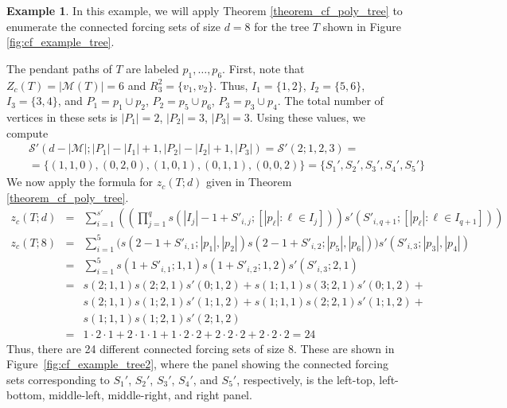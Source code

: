 \documentclass[11pt]{article}
\theoremstyle{definition}
\newtheorem{example}{Example}
\newcommand{\1}{\vspace{0.1cm}}
\newcommand{\2}{\vspace{0.2cm}}
\newcommand{\3}{\vspace{0.3cm}}
\begin{document}
\begin{example}
\label{example_tree_cf_poly}
In this example, we will apply Theorem \ref{theorem_cf_poly_tree} to enumerate the connected forcing sets of size $d=8$ for the tree $T$ shown in Figure \ref{fig:cf_example_tree}. 

The pendant paths of $T$ are labeled $p_1,\ldots,p_6$. First, note that $Z_c(T)=|\mathcal{M}(T)|=6$ and $R_3^2=\{v_1,v_2\}$. Thus, $I_1=\{1,2\}$, $I_2=\{5,6\}$, $I_3=\{3,4\}$, and $P_1=p_1\cup p_2$, $P_2=p_5\cup p_6$, $P_3=p_3\cup p_4$. The total number of vertices in these sets is $|P_1|=2$, $|P_2|=3$, $|P_3|=3$. Using these values, we compute
\begin{eqnarray*}
&&\mathcal{S}'(d-|\mathcal{M}|;|P_1|-|I_1|+1,|P_2|-|I_2|+1,|P_3|)=\mathcal{S}'(2;1,2,3)=\\
&&=\{(1,1,0),(0,2,0),(1,0,1),(0,1,1),(0,0,2)\}=\{S_1',S_2',S_3',S_4',S_5'\}
\end{eqnarray*}
We now apply the formula for $z_c(T;d)$ given in Theorem \ref{theorem_cf_poly_tree}.
\begin{eqnarray*}
z_c(T;d)&=&\sum_{i=1}^{s'}\left(\left(\prod_{j=1}^q s(|I_j|-1+S'_{i,j};[|p_\ell|:\ell\in I_j])\right)s'(S'_{i,q+1};[|p_\ell|:\ell\in I_{q+1}])\right)\\
z_c(T;8)&=&\sum_{i=1}^{5}\Big(s(2-1+S'_{i,1};|p_1|,|p_2|)s(2-1+S'_{i,2};|p_5|,|p_6|)\Big)s'(S'_{i,3};|p_3|,|p_4|)\\
&=&\sum_{i=1}^{5}s(1+S'_{i,1};1,1)s(1+S'_{i,2};1,2)s'(S'_{i,3};2,1)\\
&=&s(2;1,1)s(2;2,1)s'(0;1,2)+s(1;1,1)s(3;2,1)s'(0;1,2)+\\
&&s(2;1,1)s(1;2,1)s'(1;1,2)+s(1;1,1)s(2;2,1)s'(1;1,2)+\\
&&s(1;1,1)s(1;2,1)s'(2;1,2)\\
&=&1\cdot 2\cdot 1+2\cdot 1\cdot 1+1\cdot 2\cdot 2+2\cdot 2\cdot 2+2\cdot 2\cdot 2=24
\end{eqnarray*}
Thus, there are 24 different connected forcing sets of size 8. These are shown in Figure~\ref{fig:cf_example_tree2}, where the panel showing the connected forcing sets corresponding to $S_1'$, $S_2'$, $S_3'$, $S_4'$, and $S_5'$, respectively, is the left-top, left-bottom, middle-left, middle-right, and right panel. 




\newcommand{\TreeWithColors}[1]{
\begin{tikzpicture}[scale=0.35, style=thick, x=1cm, y=1cm]
\def\vr{4.5pt}

\path (0, 0) coordinate (v1);
\path (1, 0) coordinate (v2);
\path (2, 0) coordinate (v3);
\path (3, 0) coordinate (v4);
\path (-1, -1) coordinate (v11);
\path (0, -1) coordinate (v12);
\path (1, -1) coordinate (v21);
\path (1, -2) coordinate (v211);
\path (2, -1) coordinate (v31);
\path (3, -1) coordinate (v41);
\path (4, -1) coordinate (v42);
\path (4, -2) coordinate (v421);


\end{tikzpicture}}
\end{example}
\end{document}
